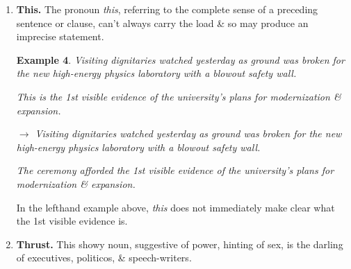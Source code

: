 \documentclass{article}
\newtheorem{example}{Example}
\begin{document}
\begin{enumerate}
	But it often doesn't work, if only because repetition makes it sound boring or silly.
	
	Consider these strategies to avoid an awkward overuse of {\it he or she} or an unintentional emphasis on the masculine:
	
	Use the plural rather than the singular.
	\begin{example}
		The writer must address his readers' concerns.
		
		$\to$ Writers must address their readers' concerns.
	\end{example}
	Eliminate the pronoun altogether.
	\begin{example}
		The writer must address his readers' concerns.
		
		$\to$ The writer must address reader's concerns.
	\end{example}
	Substitute the 2nd person for the 3rd person.
	\begin{example}
		The writer must address his readers' concerns.
		
		$\to$ As a writer, you must address your readers' concerns.
	\end{example}
	No one need fear to use {\it he} if common sense supports it.
	
	If you think {\it she} is a handy substitute for {\it he}, try it \& see what happens.
	
	Alternatively, put all controversial nouns in the plural \& avoid the choice of sex altogether, although you may find your prose sounding general \& diffuse as a result.
	\item {\bf This.} The pronoun {\it this}, referring to the complete sense of a preceding sentence or clause, can't always carry the load \& so may produce an imprecise statement.
	\begin{example}
		Visiting dignitaries watched yesterday as ground was broken for the new high-energy physics laboratory with a blowout safety wall.
		
		This is the 1st visible evidence of the university's plans for modernization \& expansion.
		
		$\to$ Visiting dignitaries watched yesterday as ground was broken for the new high-energy physics laboratory with a blowout safety wall.
		
		The ceremony afforded the 1st visible evidence of the university's plans for modernization \& expansion.
	\end{example}
	In the lefthand example above, {\it this} does not immediately make clear what the 1st visible evidence is.
	\item {\bf Thrust.} This showy noun, suggestive of power, hinting of sex, is the darling of executives, politicos, \& speech-writers.
	

\end{enumerate}
\end{document}
